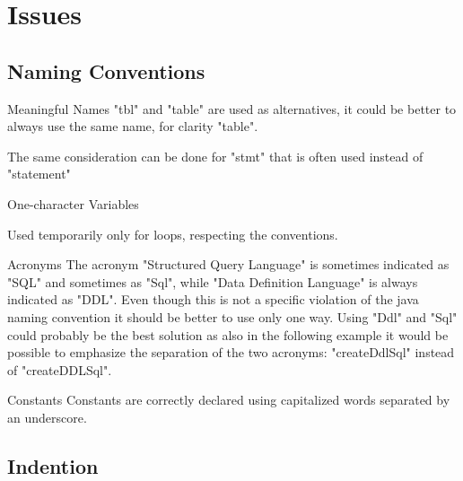 \documentclass[9pt]{beamer}
\makeatletter
\newcommand*{\currentname}{\@currentlabelname}
\makeatother
\begin{document}
\section{Issues}

\subsection{Naming Conventions}

\begin{frame}[allowframebreaks]{\currentname}

\begin{alertblock}{Meaningful Names}
"tbl" and "table" are used as alternatives, it could be better to always use the same name, for clarity "table".

The same consideration can be done for "stmt" that is often used instead of "statement"
\end{alertblock}

\begin{exampleblock}{One-character Variables}

Used temporarily only for loops, respecting the conventions.

\end{exampleblock}

\begin{alertblock}{Acronyms}
The acronym "Structured Query Language" is sometimes indicated as "SQL" and sometimes as "Sql", while "Data Definition Language" is always indicated as "DDL". Even though this is not a specific violation of the java naming convention it should be better to use only one way. Using "Ddl" and "Sql" could probably be the best solution as also in the following example it would be possible to emphasize the separation of the two acronyms: "createDdlSql" instead of "createDDLSql".
\end{alertblock}

\begin{exampleblock}{Constants}
Constants are correctly declared using capitalized words separated by an underscore.
\end{exampleblock}

\end{frame}


\subsection{Indention}
\end{document}
